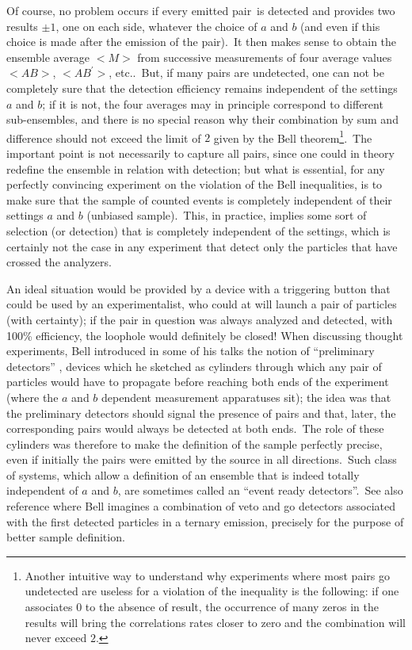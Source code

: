\documentclass[12pt,onecolumn]{article}%
\begin{document}
Of course, no problem occurs if every emitted pair\ is detected and provides
two results $\pm1$, one on each side, whatever the choice of $a$ and $b$ (and
even if this choice is made after the emission of the pair).\ It then makes
sense to obtain the ensemble average $<M>$ from successive measurements of
four average values $<AB>$, $<AB^{\prime}>$, etc..\ But, if many pairs are
undetected, one can not be completely sure that the detection efficiency
remains independent of the settings $a$ and $b$; if it is not, the four
averages may in principle correspond to different sub-ensembles, and there is
no special reason why their combination by sum and difference should not
exceed the limit of $2$ given by the Bell theorem\footnote{Another intuitive
way to understand why experiments where most pairs go undetected are useless
for a violation of the inequality is the following: if one associates $0$ to
the absence of result, the occurrence of many zeros in the results will bring
the correlations rates closer to zero and the combination will never exceed
$2$.}.\ The important point is not necessarily to capture all pairs, since one
could in theory redefine the ensemble in relation with detection; but what is
essential, for any perfectly convincing experiment on the violation of the
Bell inequalities, is to make sure that the sample of counted events is
completely independent of their settings $a$ and $b$ (unbiased sample).\ This,
in practice, implies some sort of selection (or detection) that is completely
independent of the settings, which is certainly not the case in any experiment
that detect only the particles that have crossed the analyzers.

An ideal situation would be provided by a device with a triggering button that
could be used by an experimentalist, who could at will launch a pair of
particles (with certainty); if the pair in question was always analyzed and
detected, with 100\% efficiency, the loophole would definitely be closed! When
discussing thought experiments, Bell introduced in some of his talks the
notion of ``preliminary detectors'' \cite{Bell-oral}, devices which he
sketched as cylinders through which any pair of particles would have to
propagate before reaching both ends of the experiment (where the $a$ and $b$
dependent measurement apparatuses sit); the idea was that the preliminary
detectors should signal the presence of pairs and that, later, the
corresponding pairs would always be detected at both ends.\ The role of these
cylinders was therefore to make the definition of the sample perfectly
precise, even if initially the pairs were emitted by the source in all
directions.\ Such class of systems, which allow a definition of an ensemble
that is indeed totally independent of $a$ and $b$, are sometimes called an
``event ready detectors''.\ See also reference \cite{Bell-EGAS} where Bell
imagines a combination of veto and go detectors associated with the first
detected particles in a ternary emission, precisely for the purpose of better
sample definition.
\end{document}
